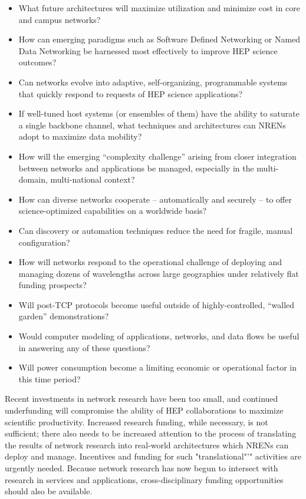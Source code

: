 \begin{itemize}
\item What future architectures will maximize utilization and minimize cost in core and campus networks?
\item How can emerging paradigms such as Software Defined Networking or Named Data Networking be harnessed most effectively to improve HEP science outcomes?
\item Can networks evolve into adaptive, self-organizing, programmable systems that quickly respond to requests of HEP science applications? 
\item If well-tuned host systems (or ensembles of them) have the ability to saturate a single backbone channel, what techniques and architectures can NRENs adopt to maximize data mobility?
\item How will the emerging “complexity challenge” arising from closer integration between networks and applications be managed, especially in the multi-domain, multi-national context?
\item How can diverse networks cooperate – automatically and securely – to offer science-optimized capabilities on a worldwide basis? 
\item Can discovery or automation techniques reduce the need for fragile, manual configuration? 
\item How will networks respond to the operational challenge of deploying  and managing dozens of wavelengths across large geographies under relatively flat funding prospects? 
\item Will post-TCP protocols become useful outside of highly-controlled, “walled garden” demonstrations? 
\item Would computer modeling of applications, networks, and data flows be useful in answering any of these questions?  
\item Will power consumption become a limiting economic or operational factor in this time period? 
\end{itemize}

Recent investments in network research have been too small, and continued underfunding will compromise the ability of HEP collaborations to maximize scientific productivity. Increased research funding, while necessary, is not sufficient; there also needs to be increased attention to the process of translating the results of network research into real-world architectures which NRENs can deploy and manage. Incentives and funding for such "translational"’" activities are urgently needed. Because network research has now begun to intersect with research in services and applications, cross-disciplinary funding opportunities should also be available.  

